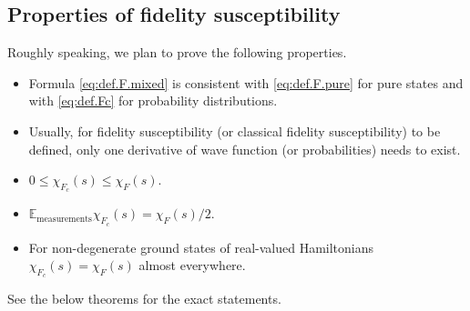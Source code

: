 \documentclass[american,aps,pra,reprint,floatfix,nofootinbib,superscriptaddress]{revtex4-2}
\begin{document}
\subsection{Properties of fidelity susceptibility}
Roughly speaking, we plan to prove the following properties.
\begin{itemize}
  \item Formula \eqref{eq:def.F.mixed} is consistent with \eqref{eq:def.F.pure}
    for pure states and with \eqref{eq:def.Fc} for probability distributions.
  \item Usually, for fidelity susceptibility (or classical fidelity
    susceptibility) to be defined, only one derivative of wave function
    (or probabilities) needs to exist.
  \item $0 \leq \chi_{F_c}(s) \leq \chi_F(s)$.
  \item $\mathbb{E}_{\textrm{measurements}} \chi_{F_c}(s) = \chi_F(s)/2$.
  \item For non-degenerate ground states of real-valued Hamiltonians
  $\chi_{F_c}(s) = \chi_F(s)$ almost everywhere.
\end{itemize}
See the below theorems for the exact statements.
\end{document}
